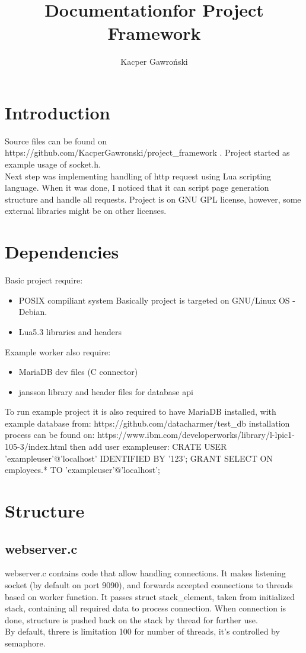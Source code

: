 \documentclass[a4paper]{article}
\title{Documentation\newline for Project Framework}
\author{Kacper Gawroński}
\begin{document}
\maketitle
\section{Introduction}
Source files can be found on https://github.com/KacperGawronski/project\_framework .\newline
Project started as example usage of socket.h.\\
Next step was implementing handling of http request using Lua scripting
language. When it was done, I noticed that it can script page generation
structure and handle all requests. Project is on GNU GPL license, 
however, some external libraries might be on other licenses.
\section{Dependencies}
Basic project require:\\
\begin{itemize}
\item{POSIX compiliant system} Basically project is targeted on GNU/Linux
OS - Debian.
\item{Lua5.3 libraries and headers}
\end{itemize}
Example worker also require:
\begin{itemize}
\item{MariaDB dev files (C connector)}
\item{jansson library and header files} for database api
\end{itemize}
To run example project it is also required to have MariaDB installed,
with example database from:\newline
https://github.com/datacharmer/test\_db\newline
installation process can be found on:\newline
https://www.ibm.com/developerworks/library/l-lpic1-105-3/index.html\newline
then add user exampleuser:\newline
CRATE USER 'exampleuser'@'localhost' IDENTIFIED BY '123';\newline
GRANT SELECT ON employees.* TO 'exampleuser'@'localhost';
\newpage
\section{Structure}
\subsection{webserver.c}
webserver.c contains code that allow handling connections.
It makes listening socket (by default on port 9090), and forwards
accepted connections to threads based on worker function. It passes
struct stack\_element, taken from initialized stack, containing all
required data to process connection. When connection is done, structure
is pushed back on the stack by thread for further use.\\
By default, threre is limitation 100 for number of threads, it's
controlled by semaphore.
\end{document}
